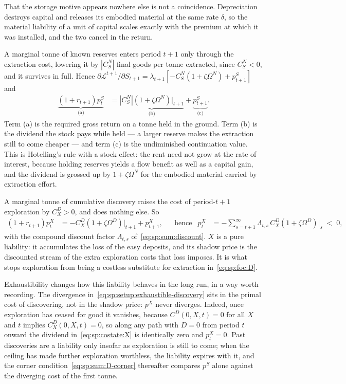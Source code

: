 That the storage motive appears nowhere else is not a coincidence. Depreciation destroys capital and releases its embodied material at the same rate $\delta$, so the material liability of a unit of capital scales exactly with the premium at which it was installed, and the two cancel in the return.

 A marginal tonne of known reserves enters period $t+1$ only through the extraction cost, lowering it by $\left|C^N_S\right|$ final goods per tonne extracted, since $C^N_S<0$, and it survives in full. Hence $\partial\mathcal L^{t+1}/\partial S_{t+1}=\lambda_{t+1}\left[-C^N_S\left(1+\zeta\Omega^N\right)+p^S_{t+1}\right]$ and
\begin{align}
\underbrace{\left(1+r_{t+1}\right)p^S_t}_{\text{(a)}} &= \underbrace{\left|C^N_S\right|\left(1+\zeta\Omega^N\right)\Big|_{t+1}}_{\text{(b)}} + \underbrace{p^S_{t+1}}_{\text{(c)}} .
\label{eq:sp:costate:S}
\end{align}
Term (a) is the required gross return on a tonne held in the ground. Term (b) is the dividend the stock pays while held --- a larger reserve makes the extraction still to come cheaper --- and term (c) is the undiminished continuation value. This is Hotelling's rule with a stock effect: the rent need not grow at the rate of interest, because holding reserves yields a flow benefit as well as a capital gain, and the dividend is grossed up by $1+\zeta\Omega^N$ for the embodied material carried by extraction effort.

 A marginal tonne of cumulative discovery raises the cost of period-$t{+}1$ exploration by $C^D_X>0$, and does nothing else. So
\begin{align}
\left(1+r_{t+1}\right)p^X_t &= -C^D_X\left(1+\zeta\Omega^D\right)\Big|_{t+1}+p^X_{t+1},
&&\text{hence}
&
p^X_t &= -\sum_{s=t+1}^\infty \Lambda_{t,s}\,C^D_X\left(1+\zeta\Omega^D\right)\Big|_s\;<\;0,
\label{eq:sp:costate:X}
\end{align}
with the compound discount factor $\Lambda_{t,s}$ of~\eqref{eq:sp:sum:discount}. $X$ is a pure liability: it accumulates the loss of the easy deposits, and its shadow price is the discounted stream of the extra exploration costs that loss imposes. It is what stops exploration from being a costless substitute for extraction in~\eqref{eq:sp:foc:D}.

Exhaustibility changes how this liability behaves in the long run, in a way worth recording. The divergence in~\eqref{eq:sp:setup:exhaustible-discovery} sits in the primal cost of discovering, not in the shadow price: $p^X$ never diverges. Indeed, once exploration has ceased for good it vanishes, because $C^D\left(0,X,t\right)=0$ for all $X$ and $t$ implies $C^D_X\left(0,X,t\right)=0$, so along any path with $D=0$ from period $t$ onward the dividend in~\eqref{eq:sp:costate:X} is identically zero and $p^X_t=0$. Past discoveries are a liability only insofar as exploration is still to come; when the ceiling has made further exploration worthless, the liability expires with it, and the corner condition~\eqref{eq:sp:sum:D-corner} thereafter compares $p^S$ alone against the diverging cost of the first tonne.

